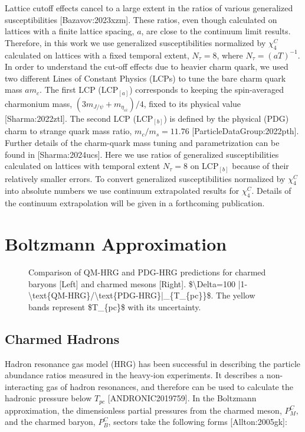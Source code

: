 \documentclass[11pt,a4paper]{article}
\begin{document}
Lattice cutoff effects cancel to a large extent in the ratios of various generalized susceptibilities  [Bazavov:2023xzm]. These ratios, even though calculated on lattices with a finite lattice spacing, $a$, are close to the continuum limit results.  Therefore, in this work we use generalized susceptibilities normalized by $\chi^C_4$ calculated on lattices with a fixed temporal extent, $N_\tau=8$, where $N_\tau=(aT)^{-1}$.   In order to understand the cut-off effects due to heavier charm quark, we used two different Lines of Constant Physics (LCPs) to tune the bare charm quark mass $am_c$.  The first LCP (LCP$_{[a]}$) corresponds to keeping the spin-averaged charmonium mass, ${(3m_{J/\psi}+m_{\eta_{c\bar{c}}})/4}$, fixed to its physical value [Sharma:2022ztl]. The second LCP (LCP$_{[b]}$)  is defined by the physical (PDG) charm to strange quark mass ratio, $m_c/m_s=11.76$ [ParticleDataGroup:2022pth].  Further details of the charm-quark mass tuning and parametrization can be found in [Sharma:2024ucs]. Here we use ratios of generalized susceptibilities calculated on lattices with temporal extent $N_\tau=8$ on LCP$_{[b]}$ because of their relatively smaller errors.  To convert generalized susceptibilities normalized by $\chi^C_4$ into absolute numbers we use continuum extrapolated results for $\chi^C_4$. Details of the continuum extrapolation will be given in a forthcoming  publication.

\section{Boltzmann Approximation}

\begin{figure}[h]
\caption{Comparison of QM-HRG and PDG-HRG predictions for charmed baryons [Left] and charmed mesons [Right]. \$\textbackslash{}Delta=100 |1-\textbackslash{}text\{QM-HRG\}/\textbackslash{}text\{PDG-HRG\}|\_\{T\_\{pc\}\}\$. The yellow bands represent \$T\_\{pc\}\$ with its uncertainty.}
\end{figure}

\begin{figure}[h]
\end{figure}

\subsection{Charmed Hadrons}

Hadron resonance gas model (HRG) has been successful in describing the particle abundance ratios measured in the heavy-ion experiments. It describes a non-interacting gas of hadron resonances, and therefore can be used to calculate the hadronic pressure below ${T_{pc}}$ [ANDRONIC2019759]. In the Boltzmann approximation, the dimensionless partial pressures from the charmed meson, ${P^C_{M}},$  and the charmed baryon, ${P^C_{B}}$, sectors take the following forms [Allton:2005gk]:
\end{document}
